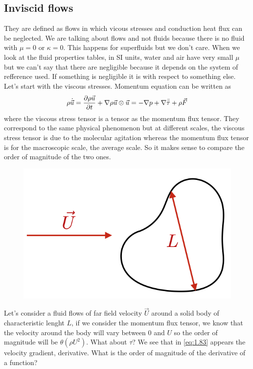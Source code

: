 	\subsection{Inviscid flows}
		They are defined as flows in which vicous stresses and conduction heat flux can be neglected.  We are talking about flows and not fluids because there is no fluid with $\mu = 0$ or $\kappa = 0$. This happens for superfluids but we don't care. When we look at the fluid properties tables, in SI units, water and air have very small $\mu$ but we can't say that there are negligible because it depends on the system of refference used. If something is negligible  it is with respect to something else. Let's start with the viscous stresses. Momentum equation can be written as 
		\begin{equation}
			\rho \dot{\vec{u}} = \frac{\D \rho \vec{u}}{\D t} + \nabla \rho \vec{u} \otimes \vec{u} = -\nabla p + \nabla \bar{\bar{\tau}} + \rho \vec{F}
		\end{equation}
		where the viscous stress tensor is a tensor as the momentum flux tensor. They correspond to the same physical phenomenon but at different scales, the viscous stress tensor is due to the molecular agitation whereas the momentum flux tensor is for the macroscopic scale, the average scale. So it makes sense to compare the order of magnitude of the two ones. \\
		
		\begin{figure}
		\vspace{-8mm}
		\includegraphics[scale=0.38]{ch1/7}
		\end{figure}
		Let's consider a fluid flows of far field velocity $\vec{U}$ around a solid body of characteristic lenght $L$, if we consider the momentum flux tensor, we know that the velocity around the body will vary between 0 and $U$ so the order of magnitude will be $\theta (\rho U^2)$. What about $\tau$? We see that in \eqref{eq:1.83} appears the velocity gradient, derivative. What is the order of magnitude of the derivative of a function?  
		
